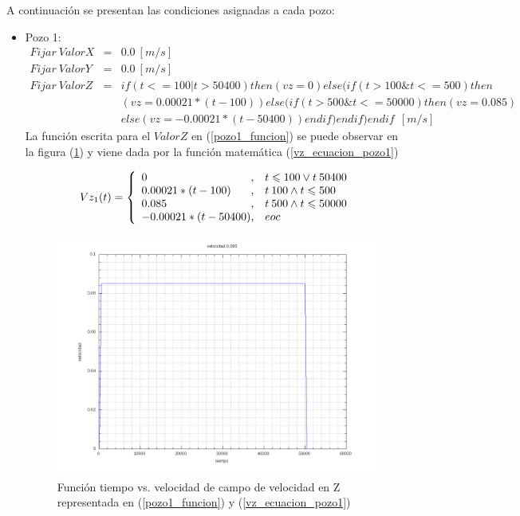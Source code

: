 \documentclass[10pt,a4paper,final]{article}
\begin{document}
A continuación se presentan las condiciones asignadas a cada pozo:
\begin{itemize}
\item Pozo 1: 
\begin{eqnarray} \label{pozo1_funcion}
\nonumber
Fijar~ValorX&=&0.0~[m/s]\\
\nonumber
Fijar~ValorY&=&0.0~[m/s]\\
Fijar~ValorZ&=& if(t<=100|t>50400)then(vz=0)else(if(t>100\& t<=500)then\\
\nonumber
&&(vz=0.00021*(t-100))else(if(t>500\& t<=50000)then(vz=0.085)\\&&
\nonumber
else(vz=-0.00021*(t-50400))endif)endif)endif~~[m/s]
\end{eqnarray}
La función escrita para el $ValorZ$ en (\ref{pozo1_funcion}) se puede observar en la figura (\ref{grafica1_0085}) y viene dada por la función matemática (\ref{vz_ecuacion_pozo1})

%
\begin{equation}\label{vz_ecuacion_pozo1}
Vz_1(t) = \left\{
\begin{array}{l@{,\quad}l}
0 & t \leqslant 100 \vee t \> 50400 \\
0.00021*(t-100) & t \> 100 \wedge t \leqslant 500 \\
0.085 & t \> 500 \wedge t \leqslant 50000 \\
-0.00021*(t-50400) & eoc
\end{array}
\right.
\end{equation}
%

\begin{figure}[tbhp]
\centerline{\includegraphics[scale=0.3]{graficas/grafica1_0085}}
\caption{Función tiempo vs. velocidad de campo de velocidad en Z representada en (\ref{pozo1_funcion}) y (\ref{vz_ecuacion_pozo1})}
\label{grafica1_0085}
\end{figure}


\end{itemize}
\end{document}
